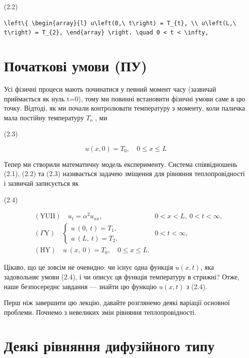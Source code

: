 \documentclass[
  ukrainian,
]{article}
\begin{document}
(2.2)

\begin{verbatim}
\left\{ \begin{array}{l} u\left(0,\ t\right) = T_{t}, \\ u\left(L,\ t\right) = T_{2}, \end{array} \right. \quad 0 < t < \infty,
\end{verbatim}

\section{Початкові умови
(ПУ)}\label{ux43fux43eux447ux430ux442ux43aux43eux432ux456-ux443ux43cux43eux432ux438-ux43fux443}

Усі фізичні процеси мають починатися у певний момент часу (зазвичай
приймається як нуль t=0), тому ми повинні встановити фізичні умови саме
в цю точку. Відтоді, як ми почали контролювати температуру з моменту,
коли паличка мала постійну температуру \(T_{\mathrm{ }o}\) , ми

(2.3)

\[
u(x, 0) = T_0, \quad 0 \le x \le L
\]

Тепер ми створили математичну модель експерименту. Система співвідношень
(2.1), (2.2) та (2.3) називається задачею зміщення для рівняння
теплопровідності і зазвичай записується як

(2.4)

\[
\begin{aligned} & (\text{YUII}) \quad u_t = \alpha^2 u_{xx}, & 0 < x < L, \ 0 < t < \infty, \\ & \left( \Gamma \text{Y} \right) \quad \begin{cases} u \ (0, \ t) = T_1, \\ u \ (L, \ t) = T_2, \end{cases} & 0 < t < \infty, \\ & (\text{HY}) \quad u \ (x, \ 0) = T_0, \quad 0 \leqslant x \leqslant L. \end{aligned}
\]

Цікаво, що це зовсім не очевидно: чи існує одна функція \(u(x, t)\), яка
задовольняє умови (2.4), і чи описує ця функція температуру в стрижні?
Отже, наше безпосереднє завдання --- знайти цю функцію \(u(x, t)\) з
(2.4).

Перш ніж завершити цю лекцію, давайте розглянемо деякі варіації основної
проблеми. Почнемо з невеликих змін рівняння теплопровідності.

\section{Деякі рівняння дифузійного
типу}\label{ux434ux435ux44fux43aux456-ux440ux456ux432ux43dux44fux43dux43dux44f-ux434ux438ux444ux443ux437ux456ux439ux43dux43eux433ux43e-ux442ux438ux43fux443}
\end{document}
